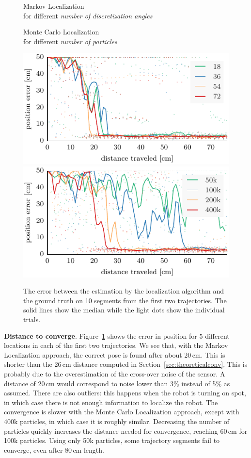 \documentclass{svmult}
\newcommand{\Fig}[1]{Figure~\ref{fig:#1}}
\newcommand{\sect}[1]{Section~\ref{sec:#1}}
\begin{document}
\begin{figure}

\begin{minipage}{.5\columnwidth}
\begin{center}
Markov Localization\\for different \emph{number of discretization angles}
\end{center}
\end{minipage}
\hfill
\begin{minipage}{.5\columnwidth}
\begin{center}
Monte Carlo Localization\\for different \emph{number of particles}
\end{center}
\end{minipage}

\includegraphics[width=.5\columnwidth]{ml-small_runs_random_12-xy}
\includegraphics[width=.5\columnwidth]{mcl-small_runs_random_12-xy}

\caption{%
The error between the estimation by the localization algorithm and the ground truth on 10 segments from the first two trajectories.
The solid lines show the median while the light dots show the individual trials.}
\label{fig:small-runs}
\end{figure}

\textbf{Distance to converge}.
\Fig{small-runs} shows the error in position for 5 different locations in each of the first two trajectories.
We see that, with the Markov Localization approach, the correct pose is found after about 20\,cm.
This is shorter than the 26\,cm distance computed in \sect{theoreticalconv}.
This is probably due to the overestimation of the cross-over noise of the sensor.
A distance of 20\,cm would correspond to noise lower than 3\% instead of 5\% as assumed.
There are also outliers: this happens when the robot is turning on spot, in which case there is not enough information to localize the robot.
The convergence is slower with the Monte Carlo Localization approach, except with 400k particles, in which case it is roughly similar.
Decreasing the number of particles quickly increases the distance needed for convergence, reaching 60\,cm for 100k particles.
Using only 50k particles, some trajectory segments fail to converge, even after 80\,cm length.
\end{document}
